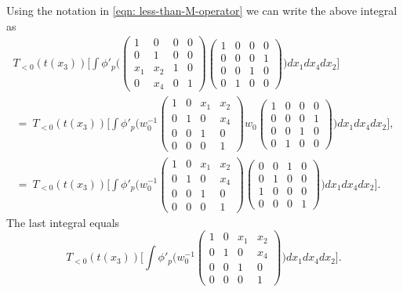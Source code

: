 \documentclass[11pt]{amsart}
\begin{document}
Using the notation in \eqref{eqn: less-than-M-operator} we can write the above integral as
\begin{multline*}
T_{<0}(t(x_3)) \biggl[\int\phi'_p\biggl( \left(\begin{smallmatrix}
		1 & 0 & 0 & 0 \\
		0 & 1 & 0 & 0 \\
		x_{1} & x_{2} & 1 & 0 \\
		0 & x_{4} & 0 & 1
	\end{smallmatrix}\right)  \left(\begin{smallmatrix}
		1 & 0 & 0 & 0 \\
		0 & 0 & 0 & 1 \\
		0 & 0 & 1 & 0 \\
		0 & 1 & 0 & 0
	\end{smallmatrix}\right)  \biggr) dx_1 dx_4 dx_2 \biggr] \\
\ = \ 
T_{<0}(t(x_3)) \biggl[ \int \phi'_p \biggl( w_0^{-1}\left(\begin{smallmatrix}
		1 & 0 & x_{1} & x_{2} \\
		0 & 1 & 0 & x_{4} \\
		0 & 0 & 1 & 0 \\
		0 & 0 & 0 & 1
	\end{smallmatrix}\right)  w_0\left(\begin{smallmatrix}
		1 & 0 & 0 & 0 \\
		0 & 0 & 0 & 1 \\
		0 & 0 & 1 & 0 \\
		0 & 1 & 0 & 0
	\end{smallmatrix}\right)  \biggr) dx_1 dx_4 dx_2 \biggr], \\
\ = \
T_{<0}(t(x_3))\biggl[ \int \phi'_p \biggl( w_0^{-1}\left(\begin{smallmatrix}
		1 & 0 & x_{1} & x_{2} \\
		0 & 1 & 0 & x_{4} \\
		0 & 0 & 1 & 0 \\
		0 & 0 & 0 & 1
	\end{smallmatrix}\right) \left(\begin{smallmatrix}
		0 & 0 & 1 & 0 \\
		0 & 1 & 0 & 0 \\
		1 & 0 & 0 & 0 \\
		0 & 0 & 0 & 1
	\end{smallmatrix}\right)  \biggr) dx_1 dx_4 dx_2 \biggr].
\end{multline*}
The last integral equals
\begin{equation}
	T_{<0}(t(x_3))\biggl[ \int \phi'_p \biggl( w_0^{-1}\left(\begin{smallmatrix}
		1 & 0 & x_{1} & x_{2} \\
		0 & 1 & 0 & x_{4} \\
		0 & 0 & 1 & 0 \\
		0 & 0 & 0 & 1
	\end{smallmatrix}\right)   \biggr) dx_1 dx_4 dx_2 \biggr] \label{eqn: x3-less-than-0}.
\end{equation}
\end{document}
